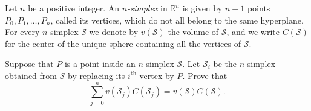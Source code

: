 Let \(n\) be a positive integer.
An \emph{\(n\)-simplex} in \(\mathbb{R}^n\) is given by \(n+1\) points \(P_0, P_1,\dots  , P_n\), called its vertices, which do not all belong to the same hyperplane.
For every \(n\)-simplex \(\mathcal{S}\) we denote by \(v(\mathcal{S})\) the volume of \(\mathcal{S}\), and we write \(C(\mathcal{S})\) for the center of the unique sphere containing all the vertices of \(\mathcal{S}\).

Suppose that \(P\) is a point inside an \(n\)-simplex \(\mathcal{S}\).
Let \(\mathcal{S}_i\) be the \(n\)-simplex obtained from \(\mathcal{S}\) by replacing its \(i^{\text{th}}\) vertex by \(P\).
Prove that
\[ \sum_{j=0}^{n}v(\mathcal{S}_j)C(\mathcal{S}_j)=v(\mathcal{S})C(\mathcal{S}). \]